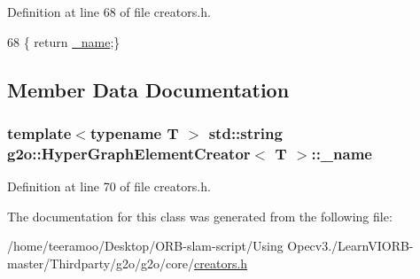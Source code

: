 Definition at line 68 of file creators.\+h.


\begin{DoxyCode}
68 \{ \textcolor{keywordflow}{return} \hyperlink{classg2o_1_1HyperGraphElementCreator_abbcc42de74a57d80b586dd843255ebae}{\_name};\}
\end{DoxyCode}


\subsection{Member Data Documentation}
\subsubsection[{\texorpdfstring{\+\_\+name}{_name}}]{\setlength{\rightskip}{0pt plus 5cm}template$<$typename T $>$ std\+::string {\bf g2o\+::\+Hyper\+Graph\+Element\+Creator}$<$ T $>$\+::\+\_\+name\hspace{0.3cm}{\ttfamily [protected]}}\hypertarget{classg2o_1_1HyperGraphElementCreator_abbcc42de74a57d80b586dd843255ebae}{}\label{classg2o_1_1HyperGraphElementCreator_abbcc42de74a57d80b586dd843255ebae}


Definition at line 70 of file creators.\+h.



The documentation for this class was generated from the following file\+:\begin{DoxyCompactItemize}
\item 
/home/teeramoo/\+Desktop/\+O\+R\+B-\/slam-\/script/\+Using Opecv3./\+Learn\+V\+I\+O\+R\+B-\/master/\+Thirdparty/g2o/g2o/core/\hyperlink{creators_8h}{creators.\+h}\end{DoxyCompactItemize}
